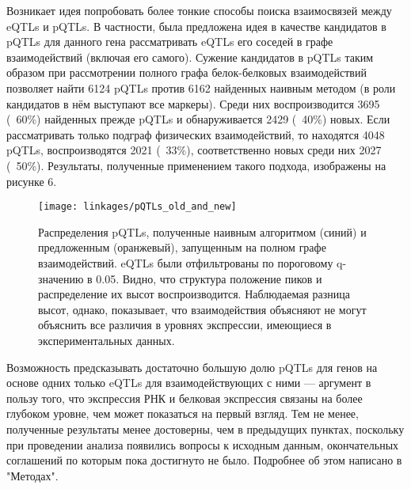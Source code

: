 \documentclass[11pt,a4paper]{report}
\theoremstyle{definition}
\theoremstyle{definition}
\theoremstyle{definition}
\begin{document}
		Возникает идея попробовать более тонкие способы поиска взаимосвязей между eQTLs и pQTLs. В частности, была предложена идея в качестве кандидатов в pQTLs для данного гена рассматривать eQTLs его соседей в графе взаимодействий (включая его самого). Сужение кандидатов в pQTLs таким образом при рассмотрении полного графа белок-белковых взаимодействий позволяет найти 6124 pQTLs против 6162 найденных наивным методом (в роли кандидатов в нём выступают все маркеры). Среди них воспроизводится 3695 (~60\%) найденных прежде pQTLs и обнаруживается 2429 (~40\%) новых. Если рассматривать только подграф физических взаимодействий, то находятся 4048 pQTLs, воспроизводятся 2021 (~33\%), соответственно новых среди них 2027 (~50\%). Результаты, полученные применением такого подхода, изображены на рисунке 6.
		\begin{figure}[H]
			\caption{Распределения pQTLs, полученные наивным алгоритмом (синий) и предложенным (оранжевый), запущенным на полном графе взаимодействий. eQTLs были отфильтрованы по пороговому q-значению в 0.05. Видно, что структура положение пиков и распределение их высот воспроизводится. Наблюдаемая разница высот, однако, показывает, что взаимодействия объясняют не могут объяснить все различия в уровнях экспрессии, имеющиеся в экспериментальных данных. } 
			\centerline{\texttt{[image: linkages/pQTLs\_old\_and\_new]}}
		\end{figure}
		
		Возможность предсказывать достаточно большую долю pQTLs для генов на основе одних только eQTLs для взаимодействующих с ними — аргумент в пользу того, что экспрессия РНК и белковая экспрессия связаны на более глубоком уровне, чем может показаться на первый взгляд. Тем не менее, полученные результаты менее достоверны, чем в предыдущих пунктах, поскольку при проведении анализа появились вопросы к исходным данным, окончательных соглашений по которым пока достигнуто не было. Подробнее об этом написано в  "Методах". 
		
\end{document}
